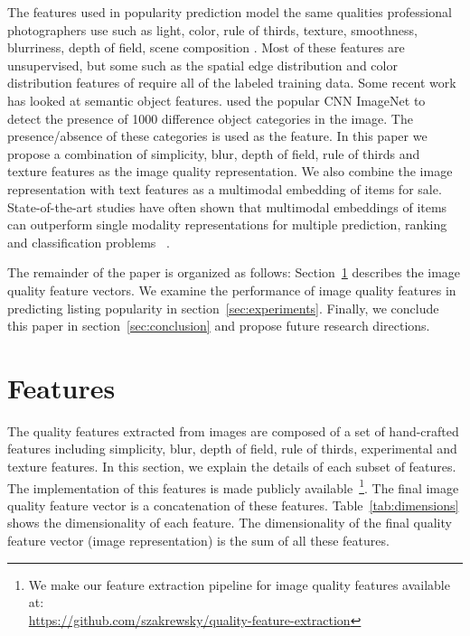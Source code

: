 \documentclass[conference,a4paper]{IEEEtran}
\begin{document}
The features used in popularity prediction model the same qualities professional photographers use such as light, color, rule of thirds, texture, smoothness, blurriness, depth of field, scene composition \cite{ke2006design} \cite{datta2006studying} \cite{chen2014aesthetic} \cite{wang2015automatic}.  Most of these features are unsupervised, but some such as the spatial edge distribution and color distribution features of \cite{ke2006design} require all of the labeled training data.  Some recent work has looked at semantic object features.  \cite{khosla2014makes} used the popular CNN ImageNet to detect the presence of 1000 difference object categories in the image.  The presence/absence of these categories is used as the feature. In this paper we propose a combination of simplicity, blur, depth of field, rule of thirds and texture features as the image quality representation. We also combine the image representation with text features as a multimodal embedding of items for sale. State-of-the-art studies have often shown that multimodal embeddings of items can outperform single modality representations for multiple prediction, ranking and classification problems~\cite{lynch2015images} \cite{yu2014click} \cite{yu2015learning}.


The remainder of the paper is organized as follows:
Section~\ref{sec:features} describes the image quality feature vectors.  We examine the
performance of image quality features in predicting listing popularity in
section~\ref{sec:experiments}. Finally, we conclude this paper in
section~\ref{sec:conclusion} and propose future research directions.


\section{Features}
\label{sec:features}
The quality features extracted from images are composed of a set of hand-crafted features including simplicity, blur, depth of field, rule of thirds, experimental and texture features. In this section, we explain the details of each subset of features. The implementation of this features is made publicly available~\footnote{We make our feature extraction pipeline for image quality features available at:\\ \url{https://github.com/szakrewsky/quality-feature-extraction}}. The final image quality feature vector is a concatenation of these features. Table~\ref{tab:dimensions} shows the dimensionality of each feature. The dimensionality of the final quality feature vector (image representation) is the sum of all these features. 
\end{document}
